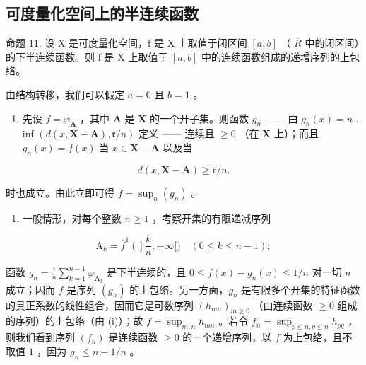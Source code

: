 \subsection{可度量化空间上的半连续函数}

命题 11. 设 X 是可度量化空间，f 是 X 上取值于闭区间 \([a, b]\) （ \(\overline{R}\) 中的闭区间）的下半连续函数。则 f 是 X 上取值于 \([a, b]\) 中的连续函数组成的递增序列的上包络。

由结构转移，我们可以假定 \(a = 0\) 且 \(b = 1\) 。

\begin{enumerate}
\def\labelenumi{(\roman{enumi})}
\tightlist
\item
  先设 \(f = \varphi_{\mathbf{A}}\) ，其中 \(\mathbf{A}\) 是 \(\mathbf{X}\) 的一个开子集。则函数 \(g_n\) —— 由 \(g_n(x) = n\) . inf \((d(x, \mathbf{X} - \mathbf{A}), \mathfrak{r}/n)\) 定义 —— 连续且 \(\geqslant 0\) （在 \(\mathbf{X}\) 上）；而且 \(g_n(x) = f(x)\) 当 \(x \in \mathbf{X} - \mathbf{A}\) 以及当
\end{enumerate}

\[
d (x, \mathbf {X} - \mathbf {A}) \geqslant \mathrm{r} / n.
\]

时也成立。由此立即可得 \(f = \sup_{n}(g_n)\) 。

\begin{enumerate}
\def\labelenumi{(\roman{enumi})}
\setcounter{enumi}{1}
\tightlist
\item
  一般情形，对每个整数 \(n \geqslant 1\) ，考察开集的有限递减序列
\end{enumerate}

\[
\mathrm{A} _ {k} = \overline {{{f}}} ^ {1} \left(\right] \frac {k}{n}, + \infty [) \quad (0 \leqslant k \leqslant n - 1);
\]

函数 \(g_{n} = \frac{1}{n}\sum_{k=1}^{n-1}\varphi_{\mathbf{A}_k}\) 是下半连续的，且 \(0 \leqslant f(x) - g_{n}(x) \leqslant 1/n\) 对一切 \(n\) 成立；因而 \(f\) 是序列 \((g_n)\) 的上包络。另一方面，\(g_{n}\) 是有限多个开集的特征函数的具正系数的线性组合，因而它是可数序列 \((h_{mn})_{m \geqslant 0}\) （由连续函数 \(\geqslant 0\) 组成的序列）的上包络（由 (i)）；故 \(f = \sup_{m,n} h_{mn}\) 。若令 \(f_{n} = \sup_{p \leqslant n, q \leqslant n} h_{pq}\) ，则我们看到序列 \((f_n)\) 是连续函数 \(\geqslant 0\) 的一个递增序列，以 \(f\) 为上包络，且不取值 \(1\) ，因为 \(g_{n} \leqslant n - 1/n\) 。

